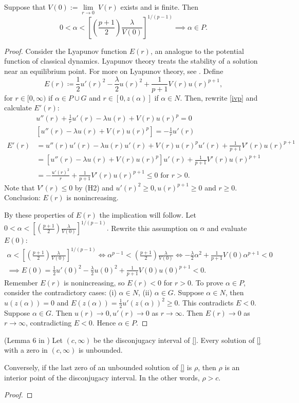 \begin{lemma}\label{lya}Suppose that $V(0):=\underset{r\to0}{\lim}~V(r)$ exists and is finite. Then $$0<\alpha<\left[\left(\frac{p+1}{2}\right)\frac{\lambda}{V(0)} \right]^{1/(p-1)}\implies \alpha\in P.$$
\begin{proof}
Consider the Lyapunov function $E(r)$, an analogue to the potential function of classical dynamics. Lyapunov theory treats the stability of a solution near an equilibrium point. For more on Lyapunov theory, see \cite{}. Define $$E(r)\coloneqq\frac{1}{2}u'(r)^2-\frac{\lambda}{2}u(r)^2+\frac{1}{p+1}V(r)u(r)^{p+1},$$  for $r\in[0,\infty)$ if $\alpha\in P\cup G$ and $r\in[0,z(\alpha)]$ if $\alpha\in N$. Then, rewrite \ref{ivp} and calculate $E'(r)$: \begin{align*} &u''(r)+\frac{1}{r}u'(r)-\lambda u(r)+V(r)u(r)^p=0\\
&\left[u''(r)-\lambda u(r)+V(r)u(r)^p\right]=-\frac{1}{r}u'(r)\\
E'(r)&=u''(r)u'(r)-\lambda u(r)u'(r)+V(r)u(r)^pu'(r)+\frac{1}{p+1}V'(r)u(r)^{p+1}\\ 
&=\left[u''(r)-\lambda u(r)+V(r)u(r)^p\right]u'(r)+\frac{1}{p+1}V'(r)u(r)^{p+1}\\
&=-\frac{u'(r)^2}{r}+\frac{1}{p+1}V'(r)u(r)^{p+1}\leq0\text{ for }r>0.
\end{align*} Note that $V'(r)\leq0$ by (H2) and $u'(r)^2\geq0, u(r)^{p+1}\geq0$ and $r\geq0$. Conclusion: $E(r)$ is nonincreasing. 

By these properties of $E(r)$ the implication will follow. Let $0<\alpha<\left[\left(\frac{p+1}{2}\right)\frac{\lambda}{V(0)} \right]^{1/(p-1)}.$ Rewrite this assumption on $\alpha$ and evaluate $E(0)$: \begin{gather*}\alpha<\left[\left(\frac{p+1}{2}\right)\frac{\lambda}{V(0)} \right]^{1/(p-1)}\iff\alpha^{p-1}<\left(\frac{p+1}{2}\right)\frac{\lambda}{V(0)}\iff
-\frac{\lambda}{2}\alpha^2+\frac{1}{p+1}V(0)\alpha^{p+1}<0\\\implies E(0)=\frac{1}{2}u'(0)^2-\frac{\lambda}{2}u(0)^2+\frac{1}{p+1}V(0)u(0)^{p+1}<0.\end{gather*} Remember $E(r)$ is nonincreasing, so $E(r)<0$ for $r>0$. To prove $\alpha\in P$, consider the contradictory cases: (i) $\alpha\in N$, (ii) $\alpha\in G$. Suppose $\alpha\in N$, then $u(z(\alpha))=0$ and $E(z(\alpha))=\frac{1}{2}u'(z(\alpha))^2\geq0$. This contradicts $E<0$. Suppose $\alpha\in G$. Then $u(r)\to0,u'(r)\to0$ as $r\to\infty$. Then $E(r)\to0$ as $r\to\infty$, contradicting $E<0$. Hence $\alpha\in P$.
\end{proof}
\end{lemma}
\newpage
\begin{lemma}\label{kwong6} (Lemma 6 in \cite{kwong}) Let $(c,\infty)$ be the disconjugacy interval of \eqref{}. Every solution of \eqref{} with a zero in $(c,\infty)$ is unbounded.

Conversely, if the last zero of an unbounded solution of \eqref{} is $\rho$, then $\rho$ is an interior point of the disconjugacy interval. In the other words, $\rho>c$.
\begin{proof} \end{proof}
\end{lemma}
